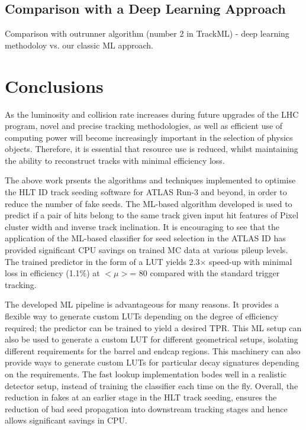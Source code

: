 \subsection{Comparison with a Deep Learning Approach}

Comparison with outrunner algorithm (number 2 in TrackML) - deep learning methodoloy vs. our classic ML approach.


\section{Conclusions}

As the luminosity and collision rate increases during future upgrades of the LHC program, novel and precise tracking methodologies, as well as efficient use of computing power will become increasingly important in the selection of physics objects. Therefore, it is essential that resource use is reduced, whilst maintaining the ability to reconstruct tracks with minimal efficiency loss. 

The above work prsents the algorithms and techniques implemented to optimise the HLT ID track seeding software for ATLAS Run-3 and beyond, in order to reduce the number of fake seeds. The ML-based algorithm developed is used to predict if a pair of hits belong to the same track given input hit features of Pixel cluster width and inverse track inclination. It is encouraging to see that the application of the ML-based classifier for seed selection in the ATLAS ID has provided significant CPU savings on trained MC data at various pileup levels. The trained predictor in the form of a LUT yields 2.3$\times$ speed-up with minimal loss in efficiency (1.1\%) at $< \mu >$= 80 compared with the standard trigger tracking. 

The developed ML pipeline is advantageous for many reasons. It provides a flexible way to generate custom LUTs depending on the degree of efficiency required; the predictor can be trained to yield a desired TPR. This ML setup can also be used to generate a custom LUT for different geometrical setups, isolating different requirements for the barrel and endcap regions. This machinery can also provide ways to generate custom LUTs for particular decay signatures depending on the requirements. The fast lookup implementation bodes well in a realistic detector setup, instead of training the classifier each time on the fly. Overall, the reduction in fakes at an earlier stage in the HLT track seeding, ensures the reduction of bad seed propagation into downstream tracking stages and hence allows significant savings in CPU.

